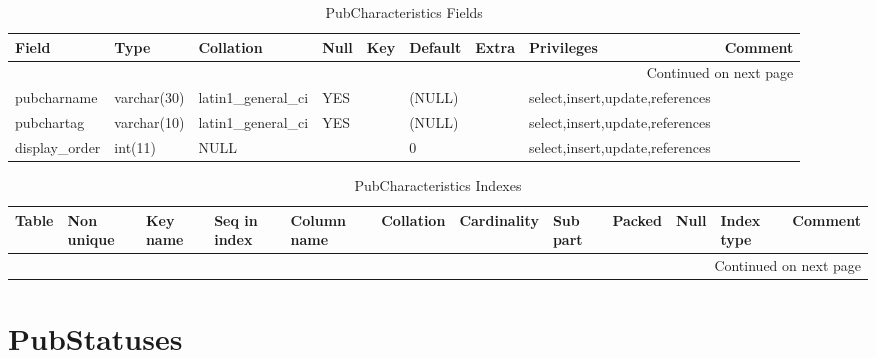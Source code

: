 \documentclass[tablesignature,landscape]{scrartcl}
\begin{document}
\begin{longtable}{|l|l|l|l|l|l|l|l|l|}
\caption{PubCharacteristics Fields} \label{tbl:pubcharacteristicsfields}\\
\hline
 Field             &  Type         &  Collation                &  Null  &  Key  &  Default  &  Extra              &  Privileges                       &  Comment \\
\hline
\endhead
\hline\multicolumn{9}{r}{Continued on next page}\
\endfoot
\endlastfoot
\hline
 pubcharid         &  int(11)      &  NULL                     &        &  PRI  &  (NULL)   &  auto\_{}increment  &  select,insert,update,references  &           \\
 pubcharname       &  varchar(30)  &  latin1\_{}general\_{}ci  &  YES   &       &  (NULL)   &                     &  select,insert,update,references  &           \\
 pubchartag        &  varchar(10)  &  latin1\_{}general\_{}ci  &  YES   &       &  (NULL)   &                     &  select,insert,update,references  &           \\
 display\_{}order  &  int(11)      &  NULL                     &        &       &  0        &                     &  select,insert,update,references  &           \\
\hline
\end{longtable}


\begin{longtable}{|l|l|l|l|l|l|l|l|l|l|l|l|}
\caption{PubCharacteristics Indexes} \label{tbl:pubcharacteristicsindexes}\\
\hline
 Table               &  Non unique  &  Key name  &  Seq in index  &  Column name  &  Collation  &  Cardinality  &  Sub part  &  Packed  &  Null  &  Index type  &  Comment \\
\hline
\endhead
\hline\multicolumn{12}{r}{Continued on next page}\
\endfoot
\endlastfoot
\hline
 PubCharacteristics  &           0  &  PRIMARY   &             1  &  pubcharid    &  A          &            4  &  (NULL)    &  (NULL)  &        &  BTREE       &           \\
\hline
\end{longtable}
\section{PubStatuses}
\label{sec-18}
\end{document}
